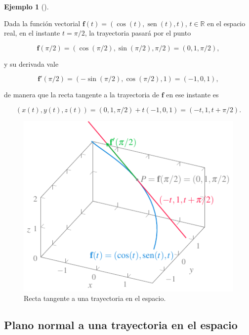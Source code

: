 \documentclass[
  a4paper,
]{scrreport}
\theoremstyle{definition}
\theoremstyle{plain}
\theoremstyle{plain}
\theoremstyle{definition}
\theoremstyle{definition}
\newtheorem{example}{Ejemplo}[chapter]
\theoremstyle{plain}
\theoremstyle{remark}
\begin{document}
\begin{example}[]\protect\hypertarget{exm-tangente-trayectoria-espacio}{}\label{exm-tangente-trayectoria-espacio}

Dada la función vectorial
\(\mathbf{f}(t)=(\cos(t), \operatorname{sen}(t), t)\),
\(t\in \mathbb{R}\) en el espacio real, en el instante \(t=\pi/2\), la
trayectoria pasará por el punto

\[
\mathbf{f}(\pi/2)=(\cos(\pi/2),\sin(\pi/2),\pi/2)=(0,1,\pi/2),
\]

y su derivada vale

\[
\mathbf{f}'(\pi/2)=(-\sin(\pi/2),\cos(\pi/2), 1)=(-1,0,1),
\]

de manera que la recta tangente a la trayectoria de \(\mathbf{f}\) en
ese instante es

\[
(x(t),y(t),z(t))=(0,1,\pi/2)+t(-1,0,1) = (-t,1,t+\pi/2).
\]

\begin{figure}

{\centering \includegraphics{img/funciones-vectoriales/tangente-trayectoria-espacio.pdf}

}

\caption{Recta tangente a una trayectoria en el espacio.}

\end{figure}

\end{example}

\hypertarget{plano-normal-a-una-trayectoria-en-el-espacio}{%
\subsection{Plano normal a una trayectoria en el
espacio}\label{plano-normal-a-una-trayectoria-en-el-espacio}}
\end{document}
